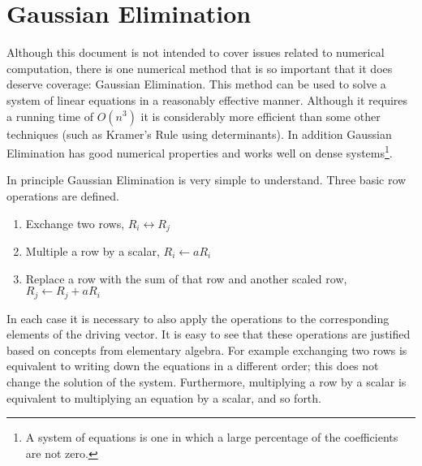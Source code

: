 
\section{Gaussian Elimination}
\label{sec:gaussian}


Although this document is not intended to cover issues related to numerical computation, there
is one numerical method that is so important that it does deserve coverage: Gaussian
Elimination. This method can be used to solve a system of linear equations in a reasonably
effective manner. Although it requires a running time of $O(n^3)$ it is considerably more
efficient than some other techniques (such as Kramer's Rule using determinants). In addition
Gaussian Elimination has good numerical properties and works well on dense systems\footnote{A
   system of equations is one in which a large percentage of the coefficients are
  not zero.}.

In principle Gaussian Elimination is very simple to understand. Three basic row operations are
defined.
\begin{enumerate}
\item Exchange two rows, $R_i \leftrightarrow R_j$
\item Multiple a row by a scalar, $R_i \leftarrow a R_i$
\item Replace a row with the sum of that row and another scaled row, $R_j \leftarrow R_j + a R_i$
\end{enumerate}

In each case it is necessary to also apply the operations to the corresponding elements of the
driving vector. It is easy to see that these operations are justified based on concepts from
elementary algebra. For example exchanging two rows is equivalent to writing down the equations
in a different order; this does not change the solution of the system. Furthermore, multiplying a
row by a scalar is equivalent to multiplying an equation by a scalar, and so forth.

